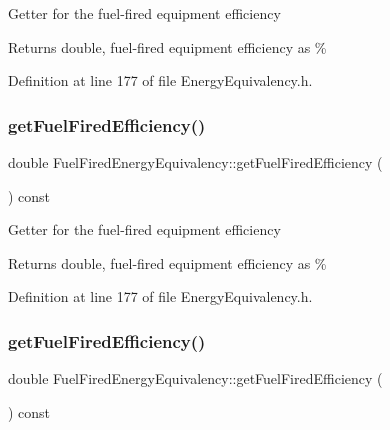 Getter for the fuel-\/fired equipment efficiency

\begin{DoxyReturn}{Returns}
double, fuel-\/fired equipment efficiency as \% 
\end{DoxyReturn}


Definition at line 177 of file Energy\+Equivalency.\+h.

\mbox{\label{class_fuel_fired_energy_equivalency_ac8695c1fe3dcffeab60b5305239d2a58}} 
\subsubsection{\texorpdfstring{get\+Fuel\+Fired\+Efficiency()}{getFuelFiredEfficiency()}\hspace{0.1cm}{\footnotesize\ttfamily [2/3]}}
{\footnotesize\ttfamily double Fuel\+Fired\+Energy\+Equivalency\+::get\+Fuel\+Fired\+Efficiency (\begin{DoxyParamCaption}{ }\end{DoxyParamCaption}) const\hspace{0.3cm}{\ttfamily [inline]}}

Getter for the fuel-\/fired equipment efficiency

\begin{DoxyReturn}{Returns}
double, fuel-\/fired equipment efficiency as \% 
\end{DoxyReturn}


Definition at line 177 of file Energy\+Equivalency.\+h.

\mbox{\label{class_fuel_fired_energy_equivalency_ac8695c1fe3dcffeab60b5305239d2a58}} 
\subsubsection{\texorpdfstring{get\+Fuel\+Fired\+Efficiency()}{getFuelFiredEfficiency()}\hspace{0.1cm}{\footnotesize\ttfamily [3/3]}}
{\footnotesize\ttfamily double Fuel\+Fired\+Energy\+Equivalency\+::get\+Fuel\+Fired\+Efficiency (\begin{DoxyParamCaption}{ }\end{DoxyParamCaption}) const\hspace{0.3cm}{\ttfamily [inline]}}

